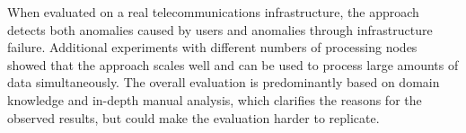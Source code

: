 When evaluated on a real telecommunications infrastructure, the approach detects both anomalies caused by users and anomalies through infrastructure failure. Additional experiments with different numbers of processing nodes showed that the approach scales well and can be used to process large amounts of data simultaneously. The overall evaluation is predominantly based on domain knowledge and in-depth manual analysis, which clarifies the reasons for the observed results, but could make the evaluation harder to replicate.
